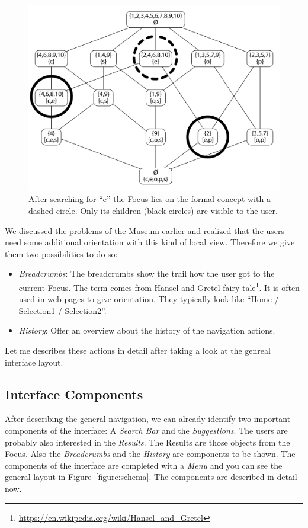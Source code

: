 \documentclass[11pt]{report}
\begin{document}
\begin{figure}[!ht]
	\centering
	\includegraphics[width=\linewidth]{images/focus}
\caption{After searching for ``e'' the Focus lies on the formal concept with a dashed circle. Only its children (black circles) are visible to the user. }
\label{figure:conceptExample}
\end{figure}

We discussed the problems of the Museum earlier and realized that the users need some additional orientation with this kind of local view. Therefore we give them two possibilities to do so:
\begin{itemize}
	\item \textit{Breadcrumbs}: The breadcrumbs show the trail how the user got to the current Focus. The term comes from Hänsel and Gretel fairy tale\footnote{\url{https://en.wikipedia.org/wiki/Hansel_and_Gretel}}. It is often used in web pages to give orientation. They typically look like ``Home / Selection1 / Selection2''.
	\item \textit{History}: Offer an overview about the history of the navigation actions.
\end{itemize}

Let me describes these actions in detail after taking a look at the genreal interface layout.

\subsection{Interface Components}
After describing the general navigation, we can already identify two important components of the interface: A \textit{Search Bar} and the \textit{Suggestions}. The users are probably also interested in the \textit{Results}. The Results are those objects from the Focus. Also the \textit{Breadcrumbs} and the \textit{History} are components to be shown. The components of the interface are completed with a \textit{Menu} and you can see the general layout in Figure~\ref{figure:schema}. The components are described in detail now. \\
\end{document}
